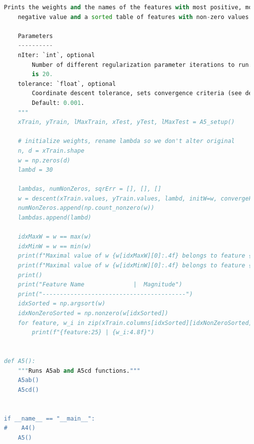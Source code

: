 \documentclass{article}
\newcommand{\1}{\mathbf{1}}
\begin{document}
\begin{enumerate}
\begin{lstlisting}[language=Python]
    Prints the weights and the names of the features with most positive, most
    negative value and a sorted table of features with non-zero values.

    Parameters
    ----------
    nIter: `int`, optional
        Number of different regularization parameter iterations to run. Default
        is 20.
    tolerance: `float`, optional
        Coordinate descent tolerance, sets convergence criteria (see descent).
        Default: 0.001.
    """
    xTrain, yTrain, lMaxTrain, xTest, yTest, lMaxTest = A5_setup()

    # initialize weights, rename lambda so we don't alter original
    n, d = xTrain.shape
    w = np.zeros(d)
    lambd = 30

    lambdas, numNonZeros, sqrErr = [], [], []
    w = descent(xTrain.values, yTrain.values, lambd, initW=w, convergeFast=False)
    numNonZeros.append(np.count_nonzero(w))
    lambdas.append(lambd)

    idxMaxW = w == max(w)
    idxMinW = w == min(w)
    print(f"Maximal value of w {w[idxMaxW][0]:.4f} belongs to feature {xTrain.columns[idxMaxW][0]}")
    print(f"Maximal value of w {w[idxMinW][0]:.4f} belongs to feature {xTrain.columns[idxMinW][0]}")
    print()
    print("Feature Name              |  Magnitude")
    print("-----------------------------------------")
    idxSorted = np.argsort(w)
    idxNonZeroSorted = np.nonzero(w[idxSorted])
    for feature, w_i in zip(xTrain.columns[idxSorted][idxNonZeroSorted], w[idxSorted][idxNonZeroSorted]):
        print(f"{feature:25} | {w_i:4.8f}")


def A5():
    """Runs A5ab and A5cd functions."""
    A5ab()
    A5cd()


if __name__ == "__main__":
#    A4()
    A5()
\end{lstlisting}
\end{enumerate}



\newpage
\end{document}

